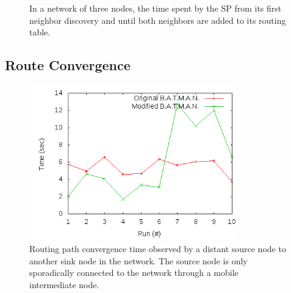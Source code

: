 \begin{figure}[h]
	\centering
	\caption{In a network of three nodes, the time spent by the \ac{SP} from its first neighbor discovery and until both neighbors are added to its routing table.}
	\label{fig:results_test_1}
\end{figure}

\subsection{Route Convergence}

\begin{figure}[h]
	\centering
	\includegraphics[width=0.8\textwidth]{images/test_2.png}
	\caption{Routing path convergence time observed by a distant source node to another sink node in the network. The source node is only sporadically connected to the network through a mobile intermediate node.}
	\label{fig:results_test_2}
\end{figure}